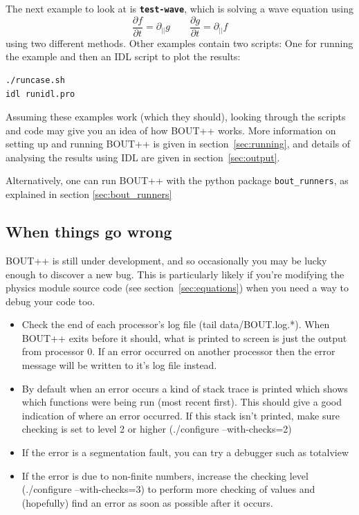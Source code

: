 \documentclass[12pt]{article}
\newcommand{\file}[1]{\texttt{\bf #1}}
\newcommand{\deriv}[2]{\ensuremath{\frac{\partial #1}{\partial #2}}}
\begin{document}
The next example to look at is \file{test-wave}, which is solving a wave equation using
\[
\deriv{f}{t} = \partial_{||} g \qquad \deriv{g}{t} = \partial_{||} f
\]
using two different methods. Other examples contain two scripts: One for running the example and then an IDL script
to plot the results:
\begin{verbatim}
./runcase.sh
idl runidl.pro
\end{verbatim}

Assuming these examples work (which they should), looking through the scripts and code
may give you an idea of how BOUT++ works. More information on setting up and running BOUT++ is given
in section~\ref{sec:running}, and details of analysing the results using IDL are given in
section~\ref{sec:output}.

Alternatively, one can run BOUT++ with the python package
\lstinline!bout_runners!, as explained in section \ref{sec:bout_runners}

\subsection{When things go wrong}

BOUT++ is still under development, and so occasionally you may be lucky
enough to discover a new bug. This is particularly likely if you're modifying
the physics module source code (see section~\ref{sec:equations}) when you
need a way to debug your code too.

\begin{itemize}
\item Check the end of each processor's log file (tail data/BOUT.log.*). When BOUT++ exits before
it should, what is printed to screen is just the output from processor 0.
If an error occurred on another processor then the error message will be written to it's log file instead.
\item By default when an error occurs a kind of stack trace is printed which shows which functions
were being run (most recent first). This should give a good indication of where
an error occurred.
If this stack isn't printed, make sure checking is set to level 2 or higher (./configure --with-checks=2)
\item If the error is a segmentation fault, you can try a debugger such as totalview
\item If the error is due to non-finite numbers, increase the checking level
(./configure --with-checks=3) to perform more checking of values
and (hopefully) find an error as soon as possible after it occurs.
\end{itemize}
\end{document}
